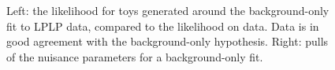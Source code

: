 \begin{figure}[h!]
\centering
{}
\caption{Left: the likelihood for toys generated around the background-only fit to LPLP data, compared to the likelihood on data. Data is in good agreement with the background-only hypothesis. Right: pulls of the nuisance parameters for a background-only fit.}
\label{fig:gofLPLP}
\end{figure}
